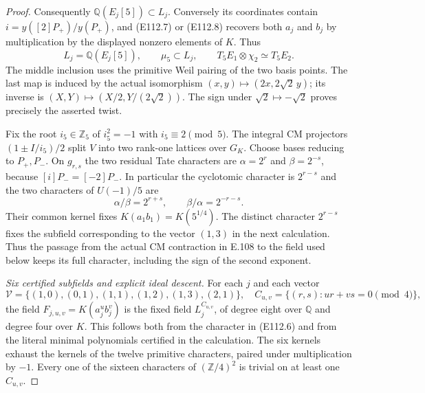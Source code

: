 \begin{proof}
Consequently $\mathbb Q(E_j[5])\subset L_j$.  Conversely its
coordinates contain
$i=y([2]P_+)/y(P_+)$, and (E112.7) or (E112.8) recovers both
$a_j$ and $b_j$ by multiplication by the displayed nonzero
elements of $K$.  Thus
\[
 L_j=\mathbb Q(E_j[5]),\qquad
 \mu_5\subset L_j,
 \qquad
 T_5E_1\otimes\chi_2\simeq T_5E_2.
 \tag{E112.10}
\]
The middle inclusion uses the primitive Weil pairing of the
two basis points.  The last map is induced by the actual
isomorphism $(x,y)\mapsto(2x,2\sqrt2\,y)$; its inverse is
$(X,Y)\mapsto(X/2,Y/(2\sqrt2))$.  The sign under
$\sqrt2\mapsto-\sqrt2$ proves precisely the asserted twist.

Fix the root $i_5\in\mathbb Z_5$ of $i_5^2=-1$ with
$i_5\equiv2\pmod5$.  The integral CM projectors
$(1\pm I/i_5)/2$ split $V$ into two rank-one lattices over
$G_K$.  Choose bases reducing to $P_+,P_-$.
On $g_{r,s}$ the two residual Tate characters are
$\alpha=2^r$ and $\beta=2^{-s}$, because $[i]P_-=[-2]P_-$.
In particular the cyclotomic character is $2^{r-s}$ and
the two characters of $U(-1)/5$ are
\[
             \alpha/\beta=2^{r+s},\qquad
             \beta/\alpha=2^{-r-s}.
 \tag{E112.11}
\]
Their common kernel fixes $K(a_1b_1)=K(5^{1/4})$.
The distinct character $2^{r-s}$ fixes the subfield
corresponding to the vector $(1,3)$ in the next calculation.
Thus the passage from the actual CM contraction in E.108 to
the field used below keeps its full character, including the
sign of the second exponent.

\emph{Six certified subfields and explicit ideal descent.}
For each $j$ and each vector
\[
 \mathcal V=\{(1,0),(0,1),(1,1),(1,2),(1,3),(2,1)\},
 \quad C_{u,v}=\{(r,s):ur+vs=0\pmod4\},
 \tag{E112.12}
\]
the field $F_{j,u,v}=K(a_j^ub_j^v)$ is the fixed field
$L_j^{C_{u,v}}$, of degree eight over $\mathbb Q$ and
degree four over $K$.  This follows both from the character
in (E112.6) and from the literal minimal polynomials certified
in the calculation.  The six kernels exhaust the kernels of
the twelve primitive characters, paired under multiplication
by $-1$.  Every one of the sixteen characters of
$(\mathbb Z/4)^2$ is trivial on at least one $C_{u,v}$.


\end{proof}
